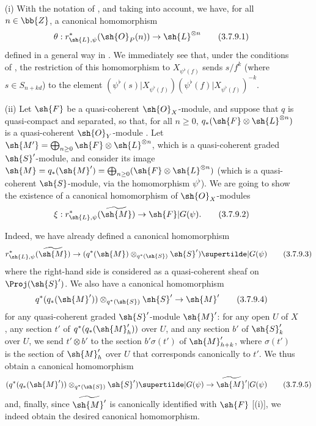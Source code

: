 \begin{remarks}[3.7.9]
\label{II.3.7.9}
\medskip\noindent
\begin{enumerate}
  \item[(i)] With the notation of , and taking  into account, we have, for all $n\in\bb{Z}$, a canonical homomorphism
    \[
    \label{II.3.7.9.1}
      \theta : r_{\sh{L},\psi}^*(\sh{O}_P(n)) \to \sh{L}^{\otimes n}
    \tag{3.7.9.1}
    \]
    defined in a general way in .
    We immediately see that, under the conditions of , the restriction of this homomorphism to $X_{\psi^\flat(f)}$ sends $s/f^k$ (where $s\in S_{n+kd}$) to the element $(\psi^\flat(s)|X_{\psi^\flat(f)})(\psi^\flat(f)|X_{\psi^\flat(f)})^{-k}$.
  \item[(ii)] Let $\sh{F}$ be a quasi-coherent $\sh{O}_X$-module, and suppose that $q$ is quasi-compact and separated, so that, for all $n\geq0$, $q_*(\sh{F}\otimes\sh{L}^{\otimes n})$ is a quasi-coherent $\sh{O}_Y$-module .
    Let $\sh{M'}=\bigoplus_{n\geq0}\sh{F}\otimes\sh{L}^{\otimes n}$, which is a quasi-coherent graded $\sh{S}'$-module, and consider its image $\sh{M}=q_*(\sh{M}')=\bigoplus_{n\geq0}(\sh{F}\otimes\sh{L}^{\otimes n})$ (which is a quasi-coherent $\sh{S}$-module, via the homomorphism $\psi^\flat$).
    We are going to show the existence of a canonical homomorphism of $\sh{O}_X$-modules
    \[
    \label{II.3.7.9.2}
      \xi : r_{\sh{L},\psi}^*(\widetilde{\sh{M}}) \to \sh{F}|G(\psi).
    \tag{3.7.9.2}
    \]

    Indeed, we have already defined  a canonical homomorphism
    \[
    \label{II.3.7.9.3}
      r_{\sh{L},\psi}^*(\widetilde{\sh{M}}) \to (q^*(\sh{M})\otimes_{q^*(\sh{S})}\sh{S}')\supertilde|G(\psi)
    \tag{3.7.9.3}
    \]
    where the right-hand side is considered as a quasi-coherent sheaf on $\Proj(\sh{S}')$.
    We also have a canonical homomorphism
    \[
    \label{II.3.7.9.4}
      q^*(q_*(\sh{M}'))\otimes_{q^*(\sh{S})}\sh{S}' \to \sh{M}'
    \tag{3.7.9.4}
    \]
    for any quasi-coherent graded $\sh{S}'$-module $\sh{M}'$: for any open $U$ of $X$, any section $t'$ of $q^*(q_*(\sh{M}'_h))$ over $U$, and any section $b'$ of $\sh{S}'_k$ over $U$, we send $t'\otimes b'$ to the section $b'\sigma(t')$ of $\sh{M}'_{h+k}$, where $\sigma(t')$ is the section of $\sh{M}'_h$ over $U$ that corresponds canonically  to $t'$.
    We thus obtain a canonical homomorphism
    \[
    \label{II.3.7.9.5}
      (q^*(q_*(\sh{M}'))\otimes_{q^*(\sh{S})}\sh{S}')\supertilde|G(\psi) \to \widetilde{\sh{M}'}|G(\psi)
    \tag{3.7.9.5}
    \]
    and, finally, since $\widetilde{\sh{M}'}$ is canonically identified with $\sh{F}$ [(i)], we indeed obtain the desired canonical homomorphism.


\end{enumerate}
\end{remarks}
